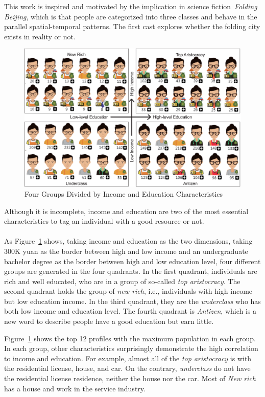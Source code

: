 This work is inspired and motivated by the implication in science fiction~\textit{Folding Beijing}, which is that people are categorized into three classes and behave in the parallel spatial-temporal patterns. The first cast explores whether the folding city exists in reality or not.

\begin{figure}[htb!]
 \centering
 \includegraphics[width=\columnwidth]{pictures/case1_1}
 \caption{Four Groups Divided by Income and Education Characteristics}
 \label{case11}
\end{figure}

Although it is incomplete, income and education are two of the most essential characteristics to tag an individual with a good resource or not.\\
\\
As Figure~\ref{case11} shows, taking income and education as the two dimensions, taking 300K yuan as the border between high and low income and an undergraduate bachelor degree as the border between high and low education level, four different groups are generated in the four quadrants. In the first quadrant, individuals are rich and well educated, who are in a group of so-called \textit{top aristocracy}. The second quadrant holds the group of \textit{new rich}, i.e., individuals with high income but low education income. In the third quadrant, they are the \textit{underclass} who has both low income and education level. The fourth quadrant is \textit{Antizen}, which is a new word to describe people have a good education but earn little.


Figure~\ref{case11} shows the top 12 profiles with the maximum population in each group. In each group, other characteristics surprisingly demonstrate the high correlation to income and education. For example, almost all of the \textit{top aristocracy} is with the residential license,  house, and car. On the contrary, \textit{underclass} do not have the residential license residence, neither the house nor the car. Most of \textit{New rich} has a house and work in the service industry.

